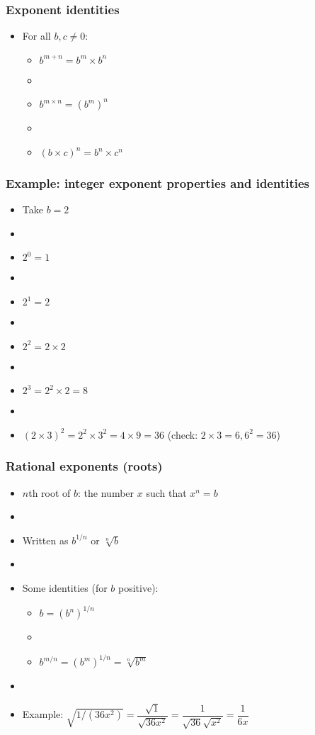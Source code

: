 \documentclass[12pt]{beamer}
\newcommand{\myframe}[1]{\begin{frame} \frametitle{#1}}
\begin{document}
\myframe{Exponent identities}
\begin{itemize}
\item For all $b,c \neq 0$:
\begin{itemize}
\item $b^{m+n} = b^m \times b^n$
\item[]
\item $b^{m \times n} = (b^m)^n$
\item[]
\item $(b\times c)^n = b^n \times c^n$
\end{itemize}
\end{itemize}
\end{frame}

\myframe{Example: integer exponent properties and identities}
\begin{itemize}
\item Take $b = 2$
\item[]
\item $2^0 = 1$
\item[]
\item $2^1 = 2$
\item[]
\item $2^2 = 2 \times 2$
\item[]
\item $2^3 = 2^2 \times 2 = 8$
\item[]
\item $(2 \times 3)^2 = 2^2 \times 3^2 = 4 \times 9 = 36$ (check: $2 \times 3 = 6, 6^2 = 36$)
\end{itemize}
\end{frame}

\myframe{Rational exponents (roots)}
\begin{itemize}
\item $n$th root of $b$: the number $x$ such that $x^n = b$ 
\item[]
\item Written as $b^{1/n}$ or $\sqrt[n]{b}$
\item[]
\item Some identities (for $b$ positive):
\begin{itemize}
\item $b = (b^n)^{1/n}$
\item[]
\item $b^{m/n} = (b^m)^{1/n} = \sqrt[n]{b^m}$
\end{itemize}
\item[]
\item Example: $\sqrt{1/(36 x^2)} = \dfrac{\sqrt{1}}{\sqrt{36x^2}} = \dfrac{1}{\sqrt{36}\sqrt{x^2}} = \dfrac{1}{6x}$
\end{itemize}
\end{frame}
\end{document}
